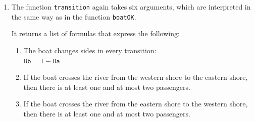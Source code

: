 \begin{enumerate}
      The function returns a formula that checks that the following condition holds when the boat 
      crosses the river from the western shore to the eastern shore:
      $$ \mathtt{Ba} = 1 \rightarrow 1 \leq \mathtt{Ma} - \mathtt{Mb} + \mathtt{Ca} - \mathtt{Cb} \leq 2 $$
      Here \texttt{Ma - Mb} is the number of missionaries on the boat and  \texttt{Ca - Cb} is the number of
      infidels on the boat.  The formula expresses that there is at least one but not more than two passengers
      on the boat. 
      The condition $\texttt{Ba} = 1$ ensures that the boat is initially on the western shore, so we are
      crossing from the west to the east.
\item The function \texttt{transition} again takes six arguments, which are interpreted in the same way as
      in the function \texttt{boatOK}.

      It returns a list of formulas that express the following:
      \begin{enumerate}
      \item The boat changes sides in every transition:
            \\[0.2cm]
            \hspace*{1.3cm}
            $\mathtt{Bb} = 1 - \mathtt{Ba}$
      \item If the boat crosses the river from the western shore to the eastern shore,
            then there is at least one and at most two passengers.
      \item If the boat crosses the river from the eastern shore to the western shore,
            then there is at least one and at most two passengers.
      \end{enumerate}
\end{enumerate}

